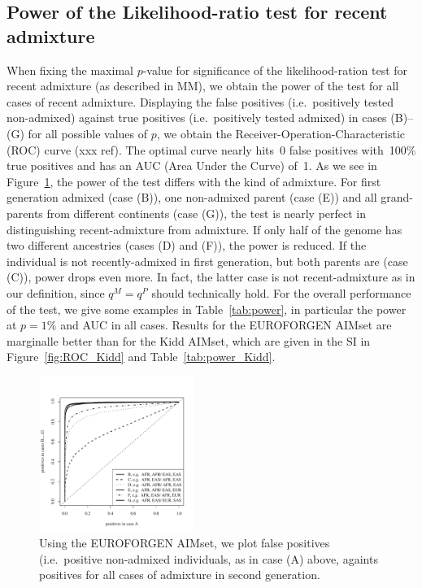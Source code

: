 \documentclass[12pt]{article}
\theoremstyle{definition}
\begin{document}
\subsection{Power of the Likelihood-ratio test for recent admixture}
When fixing the maximal $p$-value for significance of the
likelihood-ration test for recent admixture (as described in MM), we
obtain the power of the test for all cases of recent
admixture. Displaying the false positives (i.e.\ positively tested
non-admixed) against true positives (i.e.\ positively tested admixed)
in cases (B)--(G) for all possible values of $p$, we obtain the
Receiver-Operation-Characteristic (ROC) curve (xxx ref). The optimal
curve nearly hits~0 false positives with~100\% true positives and has
an AUC (Area Under the Curve) of~1. As we see in Figure~\ref{fig:ROC},
the power of the test differs with the kind of admixture. For first
generation admixed (case (B)), one non-admixed parent (case (E)) and
all grand-parents from different continents (case (G)), the test is
nearly perfect in distinguishing recent-admixture from admixture. If
only half of the genome has two different ancestries (cases (D) and
(F)), the power is reduced. If the individual is not recently-admixed
in first generation, but both parents are (case (C)), power drops even
more. In fact, the latter case is not recent-admixture as in our
definition, since $q^M = q^P$ should technically hold. For the overall
performance of the test, we give some examples in
Table~\ref{tab:power}, in particular the power at $p=1\%$ and AUC in
all cases. Results for the EUROFORGEN AIMset are marginalle better
than for the Kidd AIMset, which are given in the SI in
Figure~\ref{fig:ROC_Kidd} and Table~\ref{tab:power_Kidd}.

\begin{figure}[htb]
  \begin{center}
    \includegraphics[width=0.45\textwidth]{roc-curve-EUROFORGENE.pdf}
  \end{center}
  \caption{Using the EUROFORGEN AIMset, we plot false positives (i.e.\
    positive non-admixed individuals, as in case (A) above, againts
    positives for all cases of admixture in second generation.}
  \label{fig:ROC} 
\end{figure}
\end{document}
